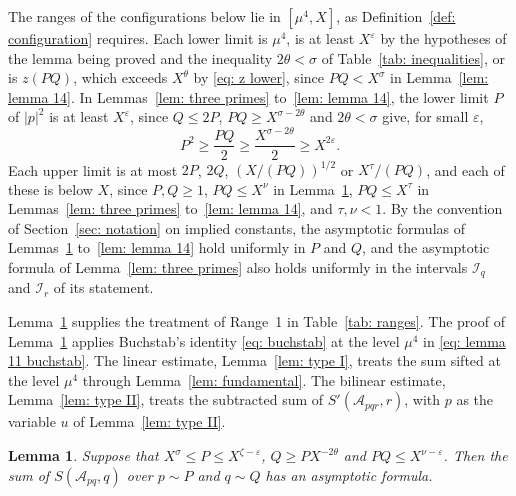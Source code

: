 \documentclass{article}
\numberwithin{equation}{section}
\newtheorem{lemma}{Lemma}
\newcommand{\Le}{\leqslant}
\newcommand{\Ge}{\geqslant}
\begin{document}
The ranges of the configurations below lie in $[\mu^4, X]$, as Definition~\ref{def: configuration} requires. Each lower limit is $\mu^4$, is at least $X^{\varepsilon}$ by the hypotheses of the lemma being proved and the inequality $2\theta < \sigma$ of Table~\ref{tab: inequalities}, or is $z(PQ)$, which exceeds $X^{\theta}$ by \eqref{eq: z lower}, since $PQ < X^{\sigma}$ in Lemma~\ref{lem: lemma 14}. In Lemmas~\ref{lem: three primes} to~\ref{lem: lemma 14}, the lower limit $P$ of $|p|^2$ is at least $X^{\varepsilon}$, since $Q \Le 2P$, $PQ \Ge X^{\sigma - 2\theta}$ and $2\theta < \sigma$ give, for small $\varepsilon$,
\begin{equation*}
P^2 \Ge \frac{PQ}{2} \Ge \frac{X^{\sigma - 2\theta}}{2} \Ge X^{2\varepsilon}.
\end{equation*}
Each upper limit is at most $2P$, $2Q$, $(X/(PQ))^{1/2}$ or $X^{\tau}/(PQ)$, and each of these is below $X$, since $P, Q \Ge 1$, $PQ \Le X^{\nu}$ in Lemma~\ref{lem: lemma 11}, $PQ \Le X^{\tau}$ in Lemmas~\ref{lem: three primes} to~\ref{lem: lemma 14}, and $\tau, \nu < 1$. By the convention of Section~\ref{sec: notation} on implied constants, the asymptotic formulas of Lemmas~\ref{lem: lemma 11} to~\ref{lem: lemma 14} hold uniformly in $P$ and $Q$, and the asymptotic formula of Lemma~\ref{lem: three primes} also holds uniformly in the intervals $\mathcal{I}_q$ and $\mathcal{I}_r$ of its statement.

Lemma~\ref{lem: lemma 11} supplies the treatment of Range~1 in Table~\ref{tab: ranges}. The proof of Lemma~\ref{lem: lemma 11} applies Buchstab's identity \eqref{eq: buchstab} at the level $\mu^4$ in \eqref{eq: lemma 11 buchstab}. The linear estimate, Lemma~\ref{lem: type I}, treats the sum sifted at the level $\mu^4$ through Lemma~\ref{lem: fundamental}. The bilinear estimate, Lemma~\ref{lem: type II}, treats the subtracted sum of $S'(\mathcal{A}_{pqr}, r)$, with $p$ as the variable $u$ of Lemma~\ref{lem: type II}.

\begin{lemma}
\label{lem: lemma 11}
Suppose that $X^{\sigma} \Le P \Le X^{\zeta - \varepsilon}$, $Q \Ge P X^{-2\theta}$ and $PQ \Le X^{\nu - \varepsilon}$. Then the sum of $S(\mathcal{A}_{pq}, q)$ over $p \sim P$ and $q \sim Q$ has an asymptotic formula.
\end{lemma}
\end{document}
